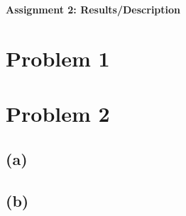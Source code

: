 \documentclass[12pt]{article}
\begin{document}
\begin{center}\begin{LARGE}
\textbf{Assignment 2: Results/Description}
\end{LARGE}\end{center}

\section*{Problem 1}



\section*{Problem 2}

\subsection*{(a)}



\subsection*{(b)}
\end{document}
